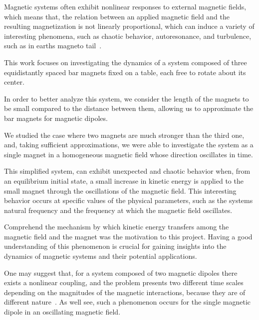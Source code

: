Magnetic systems often exhibit nonlinear responses to external magnetic fields, which means that, the relation between an applied magnetic field and the resulting magnetization is not linearly proportional, which can induce a variety of interesting phenomena, such as chaotic behavior, autoresonance, and turbulence, such as in earth\textquotesingle s magneto tail~\cite{nonlinearResponse,Bratman1983,Loeb1986,VerandaM,Brunton2017,Chang1999}. 


This work focuses on investigating the dynamics of a system composed of three equidistantly spaced bar magnets fixed on a table, each free to rotate about its center. 

In order to better analyze this system, we consider the length of the magnets to be small compared to the distance between them, allowing us to approximate the bar magnets for magnetic dipoles.

We studied the case where two magnets are much stronger than the third one, and, taking sufficient approximations, we were able to investigate the system as a single magnet in a homogeneous magnetic field whose direction oscillates in time.

This simplified system, can exhibit unexpected and chaotic behavior when, from an equilibrium initial state, a small increase in kinetic energy is applied to the small magnet through the oscillations of the magnetic field. This interesting behavior occurs at specific values of the physical parameters, such as the system\textquotesingle s natural frequency and the frequency at which the magnetic field oscillates.

Comprehend the mechanism by which kinetic energy transfers among the magnetic field and the magnet was the motivation to this project. Having a good understanding of this phenomenon is crucial for gaining insights into the dynamics of magnetic systems and their potential applications.

One may suggest that, for a system composed of two magnetic dipoles there exists a nonlinear coupling, and the problem presents two different time scales depending on the magnitudes of the magnetic interactions, because they are of different nature~\cite{LAROZE20081440}. As we\textquotesingle ll see, such a phenomenon occurs for the single magnetic dipole in an oscillating magnetic field. 

